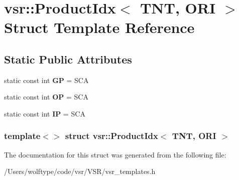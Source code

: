 \hypertarget{structvsr_1_1_product_idx_3_01_t_n_t_00_01_o_r_i_01_4}{\section{vsr\-:\-:Product\-Idx$<$ T\-N\-T, O\-R\-I $>$ Struct Template Reference}
\label{structvsr_1_1_product_idx_3_01_t_n_t_00_01_o_r_i_01_4}
}
\subsection*{Static Public Attributes}
\begin{DoxyCompactItemize}
\item 
\hypertarget{structvsr_1_1_product_idx_3_01_t_n_t_00_01_o_r_i_01_4_a7d4bc259dd7fbbcdbcf3bb81879b2318}{static const int {\bfseries G\-P} = S\-C\-A}\label{structvsr_1_1_product_idx_3_01_t_n_t_00_01_o_r_i_01_4_a7d4bc259dd7fbbcdbcf3bb81879b2318}

\item 
\hypertarget{structvsr_1_1_product_idx_3_01_t_n_t_00_01_o_r_i_01_4_a8d280ad5b05658c81569de1bc6249ef8}{static const int {\bfseries O\-P} = S\-C\-A}\label{structvsr_1_1_product_idx_3_01_t_n_t_00_01_o_r_i_01_4_a8d280ad5b05658c81569de1bc6249ef8}

\item 
\hypertarget{structvsr_1_1_product_idx_3_01_t_n_t_00_01_o_r_i_01_4_a9a713ec69f8a69cf83187e99dd0694b6}{static const int {\bfseries I\-P} = S\-C\-A}\label{structvsr_1_1_product_idx_3_01_t_n_t_00_01_o_r_i_01_4_a9a713ec69f8a69cf83187e99dd0694b6}

\end{DoxyCompactItemize}
\subsubsection*{template$<$$>$ struct vsr\-::\-Product\-Idx$<$ T\-N\-T, O\-R\-I $>$}



The documentation for this struct was generated from the following file\-:\begin{DoxyCompactItemize}
\item 
/\-Users/wolftype/code/vsr/\-V\-S\-R/vsr\-\_\-templates.\-h\end{DoxyCompactItemize}

